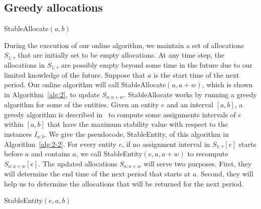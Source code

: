 \documentclass[11pt,a4paper]{article}
\renewcommand{\leq}{\leqslant}
\renewcommand{\geq}{\geqslant}
\begin{document}
\subsection{Greedy allocations}

\begin{algorithm}[b]
	\begin{algorithmic}[1]
		\caption{StableAllocate$(a,b)$}
		\label{alg:2}
		\ENDIF
		\ENDFOR
	\end{algorithmic}
\end{algorithm}

During the execution of our online algorithm, we maintain a set of allocations $S_{1:\tau}$ that are initially set to be empty allocations.  At any time step, the allocations in $S_{1:\tau}$ are possibly empty beyond some time in the future due to our limited knowledge of the future.   Suppose that $a$ is the start time of the next period.   Our online algorithm will call StableAllocate$(a,a+w)$, which is shown in Algorithm~\ref{alg:2}, to update $S_{a:a+w}$.   StableAllocate works by running a greedy algorithm for some of the entities.  Given an entity $e$ and an interval $[a,b]$, a greedy algorithm is described in~\cite{BEM18} to compute some assignments intervals of $e$ within $[a,b]$ that have the maximum stability value with respect to  the instances $I_{a:b}$.   We give the pseudocode, StableEntity, of this algorithm in Algorithm~\ref{alg:2-2}.   For every entity $e$, if no assignment interval in $S_{1:\tau}[e]$ starts before $a$ and contains $a$, we call StableEntity$(e,a,a+w)$ to recompute $S_{a:a+w}[e]$.  The updated allocations $S_{a:a+w}$ will serve two purposes.  First, they will determine the end time of the next period that starts at $a$.  Second, they will help us to determine the allocations that will be returned for the next period.





\begin{algorithm}[t]
	\begin{algorithmic}[1]
		\caption{StableEntity$(e,a,b)$}
		\label{alg:2-2}
		\WHILE{$i \leq b$}
		\ELSE
		\ENDIF
		\ENDFOR
		\IF{$k_p \geq i$}
		\ELSE
		\ENDIF
		\ENDWHILE
	\end{algorithmic}
\end{algorithm}
\end{document}
